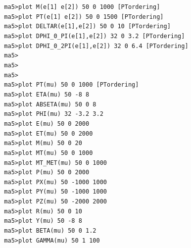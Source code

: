 \documentclass[a4paper, 10pt]{article}
\begin{document}
\texttt{ }\texttt{ }\texttt{ma5>plot M(e[1] e[2])  50 0 1000 [PTordering]\\
}
\texttt{ }\texttt{ }\texttt{ma5>plot PT(e[1] e[2]) 50 0 1500 [PTordering]\\
}
\texttt{ }\texttt{ }\texttt{ma5>plot DELTAR(e[1],e[2])      50 0 10 [PTordering]\\
}
\texttt{ }\texttt{ }\texttt{ma5>plot DPHI\_0\_PI(e[1],e[2])   32 0 3.2 [PTordering]\\
}
\texttt{ }\texttt{ }\texttt{ma5>plot DPHI\_0\_2PI(e[1],e[2])  32 0 6.4 [PTordering]\\
}
\texttt{ }\texttt{ }\texttt{ma5>\\
}
\texttt{ }\texttt{ }\texttt{ma5>\\
}
\texttt{ }\texttt{ }\texttt{ma5>\\
}
\texttt{ }\texttt{ }\texttt{ma5>plot PT(mu)      50 0 1000 [PTordering]\\
}
\texttt{ }\texttt{ }\texttt{ma5>plot ETA(mu)     50 -8 8\\
}
\texttt{ }\texttt{ }\texttt{ma5>plot ABSETA(mu)  50 0 8\\
}
\texttt{ }\texttt{ }\texttt{ma5>plot PHI(mu)     32 -3.2 3.2\\
}
\texttt{ }\texttt{ }\texttt{ma5>plot E(mu)       50 0 2000\\
}
\texttt{ }\texttt{ }\texttt{ma5>plot ET(mu)      50 0 2000\\
}
\texttt{ }\texttt{ }\texttt{ma5>plot M(mu)       50 0 20\\
}
\texttt{ }\texttt{ }\texttt{ma5>plot MT(mu)      50 0 1000\\
}
\texttt{ }\texttt{ }\texttt{ma5>plot MT\_MET(mu)  50 0 1000\\
}
\texttt{ }\texttt{ }\texttt{ma5>plot P(mu)       50 0 2000\\
}
\texttt{ }\texttt{ }\texttt{ma5>plot PX(mu)      50 -1000 1000\\
}
\texttt{ }\texttt{ }\texttt{ma5>plot PY(mu)      50 -1000 1000\\
}
\texttt{ }\texttt{ }\texttt{ma5>plot PZ(mu)      50 -2000 2000\\
}
\texttt{ }\texttt{ }\texttt{ma5>plot R(mu)       50 0 10\\
}
\texttt{ }\texttt{ }\texttt{ma5>plot Y(mu)       50 -8 8\\
}
\texttt{ }\texttt{ }\texttt{ma5>plot BETA(mu)    50 0 1.2\\
}
\texttt{ }\texttt{ }\texttt{ma5>plot GAMMA(mu)   50 1 100\\
}
\end{document}
